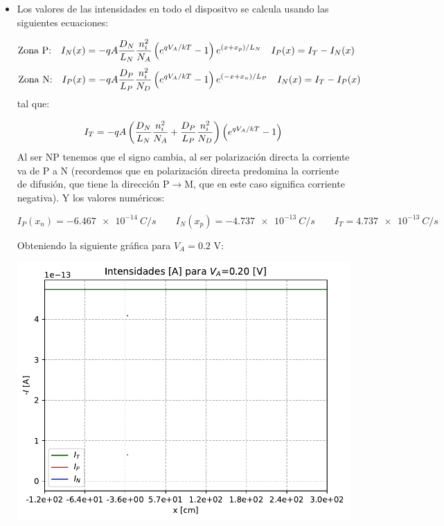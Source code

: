 \begin{itemize}
    \item Los valores de las intensidades en todo el dispositvo se calcula usando las siguientes ecuaciones: 
    
    \begin{equation*}
        \text{Zona P:} \quad 
        I_N(x) = -qA\frac{D_N}{L_N} \frac{n_i^2}{N_A}  \left( e^{qV_A/kT}-1 \right) e^{(x+x_p)/L_N} \quad I_P(x) = I_T - I_N (x)
    \end{equation*}
    \begin{equation*}
        \text{Zona N:} \quad 
        I_P(x) = - qA\frac{D_P}{L_P} \frac{n_i^2}{N_D}  \left( e^{qV_A/kT}-1 \right) e^{(-x+x_n)/L_P} \quad I_N(x) = I_T - I_P (x)
    \end{equation*}
    tal que:

    \begin{equation*}
        I_T = -qA\left( \frac{D_N}{L_N} \frac{n_i^2}{N_A}+\frac{D_P}{L_P} \frac{n_i^2}{N_D} \right)  \left( e^{q V_A/kT}-1 \right)
    \end{equation*}
    Al ser NP tenemos que el signo cambia, al ser polarización directa la corriente va de P a N (recordemos que en polarización directa predomina la corriente de difusión, que tiene la dirección P$\rightarrow$M, que en este caso significa corriente negativa). Y los valores numéricos:

    \begin{equation}
        I_P (x_n) = \SI{-6.467e-14}{C/s} \qquad 
        I_N (x_p) = \SI{-4.737e-13}{C/s} \qquad
        I_T = \SI{4.737e-13}{C/s}
    \end{equation}

    Obteniendo la siguiente gráfica para $V_A=0.2$ V: 


    \begin{center} 
        \includegraphics[width=0.6\linewidth]{Ejercicios/Ch_03/03_06_02.pdf}
    \end{center}
    
\end{itemize}



